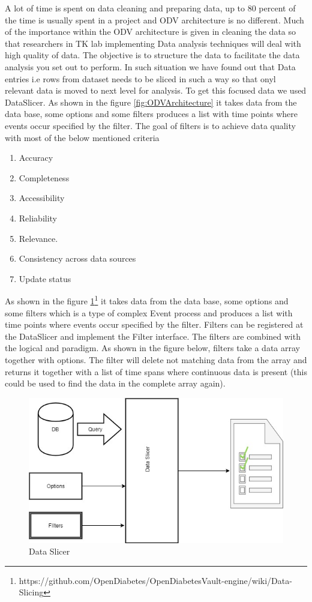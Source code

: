 \documentclass[article,type=msc,colorback,accentcolor=tud9c,twoside,11pt]{tudthesis}
\begin{document}
A lot of time is spent on data cleaning and preparing data, up to 80 percent \cite{TinyData} of the time is usually spent in a project and ODV architecture is no different. Much of the importance within the ODV architecture is given in cleaning the data so that researchers in TK lab implementing Data analysis techniques will deal with high quality of data. The objective is to structure the data to facilitate the data analysis you set out to perform. In such situation we have found out that Data entries i.e rows from dataset needs to be sliced in such a way so that onyl relevant data is moved to next level for analysis. To get this focused data we used DataSlicer. As shown in the figure \ref{fig:ODVArchitecture} it takes data from the data base, some options and some filters produces a list with time points where events occur specified by the filter. The goal of filters is to achieve data quality with most of the below mentioned criteria
\begin{enumerate}
	\item Accuracy
	\item Completeness
	\item Accessibility
	\item Reliability
	\item Relevance.
	\item Consistency across data sources
	\item Update status
\end{enumerate}
As shown in the figure \ref{fig:Dataslicer}\footnote{https://github.com/OpenDiabetes/OpenDiabetesVault-engine/wiki/Data-Slicing} it takes data from the data base, some options and some filters which is a type of complex Event process \cite{EventProcessing} and produces a list with time points where events occur specified by the filter. Filters can be registered at the DataSlicer and implement the Filter interface. The filters are combined with the logical and paradigm. As shown in the figure below, filters take a data array together with options. The filter will delete not matching data from the array and returns it together with a list of time spans where continuous data is present (this could be used to find the data in the complete array again). 
\begin{figure}[h]
	\centering
	\includegraphics[scale=0.7]{Dataslicer.jpg}
	\caption{Data Slicer}
	\label{fig:Dataslicer}
\end{figure}
\end{document}
